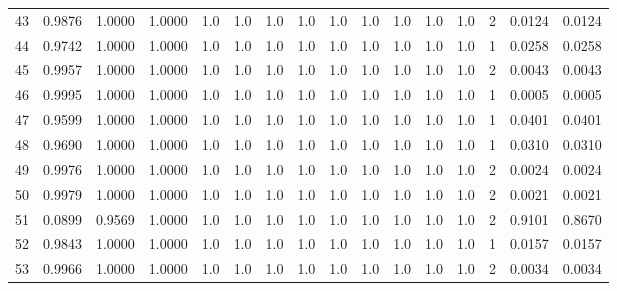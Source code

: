 \begin{tabular}{lrrrrrrrrrrrrrrr}
43  &      0.9876 &  1.0000 &  1.0000 &     1.0 &     1.0 &     1.0 &     1.0 &     1.0 &     1.0 &     1.0 &      1.0 &        1.0 &      2 &                    0.0124 &                     0.0124 \\
44  &      0.9742 &  1.0000 &  1.0000 &     1.0 &     1.0 &     1.0 &     1.0 &     1.0 &     1.0 &     1.0 &      1.0 &        1.0 &      1 &                    0.0258 &                     0.0258 \\
45  &      0.9957 &  1.0000 &  1.0000 &     1.0 &     1.0 &     1.0 &     1.0 &     1.0 &     1.0 &     1.0 &      1.0 &        1.0 &      2 &                    0.0043 &                     0.0043 \\
46  &      0.9995 &  1.0000 &  1.0000 &     1.0 &     1.0 &     1.0 &     1.0 &     1.0 &     1.0 &     1.0 &      1.0 &        1.0 &      1 &                    0.0005 &                     0.0005 \\
47  &      0.9599 &  1.0000 &  1.0000 &     1.0 &     1.0 &     1.0 &     1.0 &     1.0 &     1.0 &     1.0 &      1.0 &        1.0 &      1 &                    0.0401 &                     0.0401 \\
48  &      0.9690 &  1.0000 &  1.0000 &     1.0 &     1.0 &     1.0 &     1.0 &     1.0 &     1.0 &     1.0 &      1.0 &        1.0 &      1 &                    0.0310 &                     0.0310 \\
49  &      0.9976 &  1.0000 &  1.0000 &     1.0 &     1.0 &     1.0 &     1.0 &     1.0 &     1.0 &     1.0 &      1.0 &        1.0 &      2 &                    0.0024 &                     0.0024 \\
50  &      0.9979 &  1.0000 &  1.0000 &     1.0 &     1.0 &     1.0 &     1.0 &     1.0 &     1.0 &     1.0 &      1.0 &        1.0 &      2 &                    0.0021 &                     0.0021 \\
51  &      0.0899 &  0.9569 &  1.0000 &     1.0 &     1.0 &     1.0 &     1.0 &     1.0 &     1.0 &     1.0 &      1.0 &        1.0 &      2 &                    0.9101 &                     0.8670 \\
52  &      0.9843 &  1.0000 &  1.0000 &     1.0 &     1.0 &     1.0 &     1.0 &     1.0 &     1.0 &     1.0 &      1.0 &        1.0 &      1 &                    0.0157 &                     0.0157 \\
53  &      0.9966 &  1.0000 &  1.0000 &     1.0 &     1.0 &     1.0 &     1.0 &     1.0 &     1.0 &     1.0 &      1.0 &        1.0 &      2 &                    0.0034 &                     0.0034 \\

\end{tabular}
